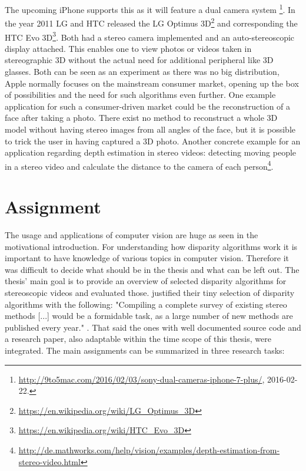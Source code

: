 The upcoming iPhone supports this as it will feature a dual camera system \footnote{\url{http://9to5mac.com/2016/02/03/sony-dual-cameras-iphone-7-plus/}, 2016-02-22.}.
In the year 2011 LG and HTC released the LG Optimus 3D\footnote{\url{https://en.wikipedia.org/wiki/LG_Optimus_3D} } and corresponding the HTC Evo 3D\footnote{\url{https://en.wikipedia.org/wiki/HTC_Evo_3D}}.
Both had a stereo camera implemented and an auto-stereoscopic display attached.
This enables one to view photos or videos taken in stereographic 3D without the actual need for additional peripheral like 3D glasses.
Both can be seen as an experiment as there was no big distribution, Apple normally focuses on the mainstream consumer market, opening up the box of possibilities and the need for such algorithms even further.
One example application for such a consumer-driven market could be the reconstruction of a face after taking a photo.
There exist no method to reconstruct a whole 3D model without having stereo images from all angles of the face, but it is possible to trick the user in having captured a 3D photo.
Another concrete example for an application regarding depth estimation in stereo videos: detecting moving people in a stereo video and calculate the distance to the camera of each person\footnote{\url{http://de.mathworks.com/help/vision/examples/depth-estimation-from-stereo-video.html}}.

\section{Assignment}

The usage and applications of computer vision are huge as seen in the motivational introduction.
For understanding how disparity algorithms work it is important to have knowledge of various topics in computer vision.
Therefore it was difficult to decide what should be in the thesis and what can be left out.
The thesis' main goal is to provide an overview of selected disparity algorithms for stereoscopic videos and evaluated those.
\citeauthor{scharstein2002taxonomy} justified their tiny selection of disparity algorithms with the following: "Compiling a complete survey of existing stereo methods [...] would be a formidable task, as a large number of new methods are published every year." \citep{scharstein2002taxonomy}.
That said the ones with well documented source code and a research paper, also adaptable within the time scope of this thesis, were integrated.
The main assignments can be summarized in three research tasks:

